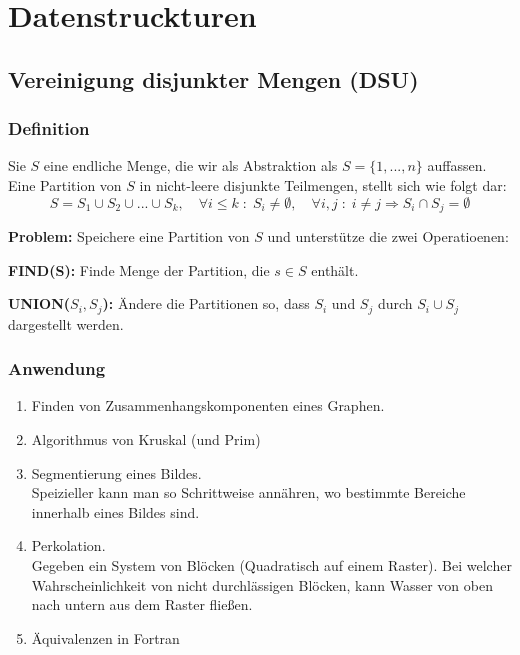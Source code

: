 \chapter{Datenstruckturen}

\section{Vereinigung disjunkter Mengen (DSU)}

\subsection{Definition}

Sie $S$ eine endliche Menge, die wir als Abstraktion als $S = \{ 1, ... , n\}$ auffassen.\\

Eine Partition von $S$ in nicht-leere disjunkte Teilmengen, stellt sich wie folgt dar:
$$
S = S_1 \cup S_2 \cup ... \cup S_k , \quad \forall i \leq k \; : \; S_i \not= \emptyset , \quad \forall i,j \; : \; i \not= j \Rightarrow S_i \cap S_j = \emptyset
$$

\textbf{Problem:} Speichere eine Partition von $S$ und unterstütze die zwei Operatioenen:
\begin{description}

\item{\bfseries FIND(S):} Finde Menge der Partition, die $s \in S$ enthält.

\item{\bfseries UNION($S_i,S_j$):} Ändere die Partitionen so, dass $S_i$ und $S_j$ durch $S_i \cup S_j$ dargestellt werden.

\end{description}

\subsection{Anwendung}

\begin{enumerate}[\bfseries (1)]

\item Finden von Zusammenhangskomponenten eines Graphen.

\item Algorithmus von Kruskal (und Prim)

\item Segmentierung eines Bildes.\\
Speizieller kann man so Schrittweise annähren, wo bestimmte Bereiche innerhalb eines Bildes sind.

\item Perkolation.\\
Gegeben ein System von Blöcken (Quadratisch auf einem Raster). Bei welcher Wahrscheinlichkeit von nicht durchlässigen Blöcken, kann Wasser von oben nach untern aus dem Raster fließen.

\item Äquivalenzen in Fortran

\end{enumerate}

